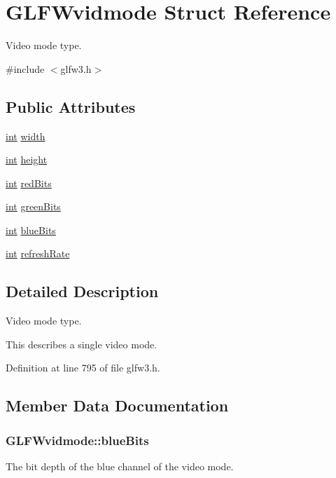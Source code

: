 \hypertarget{struct_g_l_f_wvidmode}{\section{G\-L\-F\-Wvidmode Struct Reference}
\label{struct_g_l_f_wvidmode}
}


Video mode type.  




{\ttfamily \#include $<$glfw3.\-h$>$}

\subsection*{Public Attributes}
\begin{DoxyCompactItemize}
\item 
\hyperlink{wglew_8h_a500a82aecba06f4550f6849b8099ca21}{int} \hyperlink{struct_g_l_f_wvidmode_a698dcb200562051a7249cb6ae154c71d}{width}
\item 
\hyperlink{wglew_8h_a500a82aecba06f4550f6849b8099ca21}{int} \hyperlink{struct_g_l_f_wvidmode_ac65942a5f6981695517437a9d571d03c}{height}
\item 
\hyperlink{wglew_8h_a500a82aecba06f4550f6849b8099ca21}{int} \hyperlink{struct_g_l_f_wvidmode_a6066c4ecd251098700062d3b735dba1b}{red\-Bits}
\item 
\hyperlink{wglew_8h_a500a82aecba06f4550f6849b8099ca21}{int} \hyperlink{struct_g_l_f_wvidmode_a292fdd281f3485fb3ff102a5bda43faa}{green\-Bits}
\item 
\hyperlink{wglew_8h_a500a82aecba06f4550f6849b8099ca21}{int} \hyperlink{struct_g_l_f_wvidmode_af310977f58d2e3b188175b6e3d314047}{blue\-Bits}
\item 
\hyperlink{wglew_8h_a500a82aecba06f4550f6849b8099ca21}{int} \hyperlink{struct_g_l_f_wvidmode_a791bdd6c7697b09f7e9c97054bf05649}{refresh\-Rate}
\end{DoxyCompactItemize}


\subsection{Detailed Description}
Video mode type. 

This describes a single video mode. 

Definition at line 795 of file glfw3.\-h.



\subsection{Member Data Documentation}
\hypertarget{struct_g_l_f_wvidmode_af310977f58d2e3b188175b6e3d314047}{
\subsubsection[{blue\-Bits}]{ G\-L\-F\-Wvidmode\-::blue\-Bits}}\label{struct_g_l_f_wvidmode_af310977f58d2e3b188175b6e3d314047}
The bit depth of the blue channel of the video mode. 

